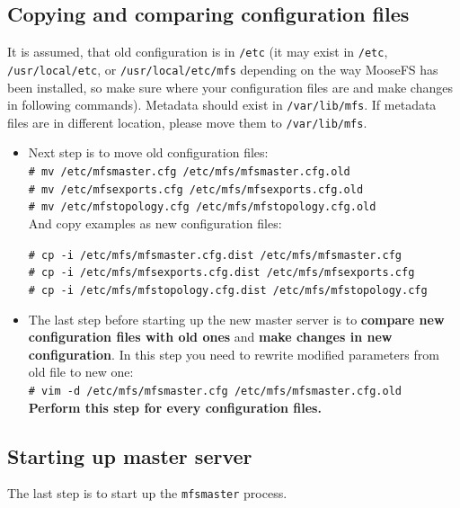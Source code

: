 \documentclass[a4paper,11pt,english]{report}
\def\code#1{\texttt{#1}}
\begin{document}
		\subsection{Copying and comparing configuration files}
		It is assumed, that old configuration is in \code{/etc} (it may exist in \code{/etc}, \code{/usr/local/etc}, or \code{/usr/local/etc/mfs} depending on the way MooseFS has been installed, so make sure where your configuration files are and make changes in following commands). Metadata should exist in \code{/var/lib/mfs}. If metadata files are in different location, please move them to \code{/var/lib/mfs}.
		\begin{itemize}
			\item Next step is to move old configuration files: \\
				\code{\# mv /etc/mfsmaster.cfg /etc/mfs/mfsmaster.cfg.old} \\
				\code{\# mv /etc/mfsexports.cfg /etc/mfs/mfsexports.cfg.old} \\
				\code{\# mv /etc/mfstopology.cfg /etc/mfs/mfstopology.cfg.old} \\
				
				And copy examples as new configuration files:
				
				\code{\# cp -i /etc/mfs/mfsmaster.cfg.dist /etc/mfs/mfsmaster.cfg} \\
				\code{\# cp -i /etc/mfs/mfsexports.cfg.dist /etc/mfs/mfsexports.cfg} \\
				\code{\# cp -i /etc/mfs/mfstopology.cfg.dist /etc/mfs/mfstopology.cfg}
				
				
			\item The last step before starting up the new master server is to \textbf{compare new configuration files with old ones} and \textbf{make changes in new configuration}. In this step you need to rewrite modified parameters from old file to new one: \\
				\code{\# vim -d /etc/mfs/mfsmaster.cfg /etc/mfs/mfsmaster.cfg.old} \\
				\textbf{Perform this step for every configuration files.}
		\end{itemize}
		
		\bigskip
		\subsection{Starting up master server}
		The last step is to start up the \code{mfsmaster} process.
		
		\bigskip
		\bigskip
\end{document}
